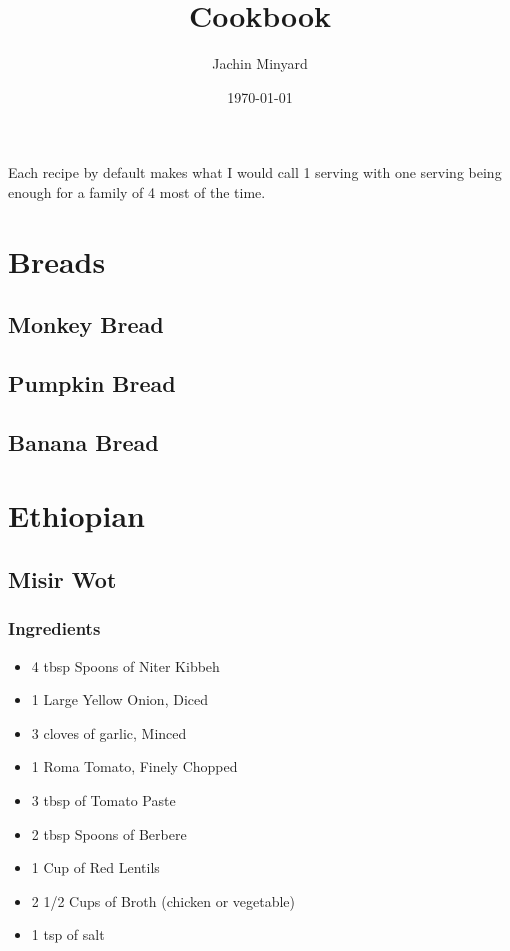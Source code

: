 \documentclass[11pt]{article}
\author{Jachin Minyard}
\date{\today}
\title{Cookbook}
\begin{document}
\maketitle

Each recipe by default makes what I would call 1 serving with one serving being enough for a family of 4 most of the time.
\section{Breads}
\label{sec:org5f9f5b1}
\subsection{Monkey Bread}
\label{sec:org7f68573}
\subsection{Pumpkin Bread}
\label{sec:org5da95eb}
\subsection{Banana Bread}
\label{sec:orgbb9be8f}
\section{Ethiopian}
\label{sec:org82c9c39}
\subsection{Misir Wot}
\label{sec:org078921a}
\subsubsection*{Ingredients}
\label{sec:orgbfe5001}
\begin{itemize}
\item 4 tbsp Spoons of Niter Kibbeh
\item 1 Large Yellow Onion, Diced
\item 3 cloves of garlic, Minced
\item 1 Roma Tomato, Finely Chopped
\item 3 tbsp of Tomato Paste
\item 2 tbsp Spoons of Berbere
\item 1 Cup of Red Lentils
\item 2 1/2 Cups of Broth (chicken or vegetable)
\item 1 tsp of salt
\end{itemize}
\end{document}
